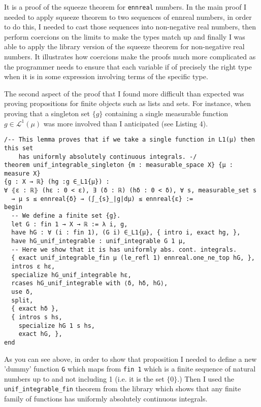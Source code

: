 \documentclass[11pt]{article}
\newenvironment{code}{\captionsetup{type=listing}}{}
\newcommand\Lmu{\mathcal{L}^1(\mu)}
\begin{document}
It is a proof of the squeeze theorem for \texttt{ennreal} numbers. In the main proof
I needed to apply squeeze theorem to two sequences of ennreal numbers, in order
to do this, I needed to cast those sequences into non-negative real numbers,
then perform coercions on the limits to make the types match up and finally
I was able to apply the library version of the squeeze theorem for non-negative
real numbers. It illustrates how coercions make the proofs much more complicated
as the programmer needs to ensure that each variable if of precisely the right
type when it is in some expression involving terms of the specific type.

The second aspect of the proof that I found more difficult than expected was
proving propositions for finite objects such as lists and sets. For instance,
when proving that a singleton set $\lbrace g\rbrace$ containing a single measurable
function  $g \in \Lmu $ was more involved than I anticipated (see Listing 4).
\begin{code}
\begin{verbatim}
/-- This lemma proves that if we take a single function in L1(μ) then this set
    has uniformly absolutely continuous integrals. -/
theorem unif_integrable_singleton {m : measurable_space X} {μ : measure X}
{g : X → ℝ} (hg :g ∈_L1{μ}) :
∀ ⦃ε : ℝ⦄ (hε : 0 < ε), ∃ (δ : ℝ) (hδ : 0 < δ), ∀ s, measurable_set s
  → μ s ≤ ennreal{δ} → (∫_{s}_|g|dμ) ≤ ennreal{ε} :=
begin
  -- We define a finite set {g}.
  let G : fin 1 → X → ℝ := λ i, g,
  have hG : ∀ (i : fin 1), (G i) ∈_L1{μ}, { intro i, exact hg, },
  have hG_unif_integrable : unif_integrable G 1 μ,
  -- Here we show that it is has uniformly abs. cont. integrals.
  { exact unif_integrable_fin μ (le_refl 1) ennreal.one_ne_top hG, },
  intros ε hε,
  specialize hG_unif_integrable hε,
  rcases hG_unif_integrable with ⟨δ, hδ, hG⟩,
  use δ,
  split,
  { exact hδ },
  { intros s hs,
    specialize hG 1 s hs,
    exact hG, },
end
\end{verbatim}
\end{code}

As you can see above, in order to show that proposition I needed to define a new
'dummy' function \texttt{G} which maps from \texttt{fin 1} which is a finite sequence
of natural numbers up to and not including 1 (i.e. it is the set $\lbrace 0 \rbrace$.)
Then I used the \texttt{unif\_integrable\_fin} theorem from the library which shows that
any finite family of functions has uniformly absolutely continuous integrals.
\end{document}
